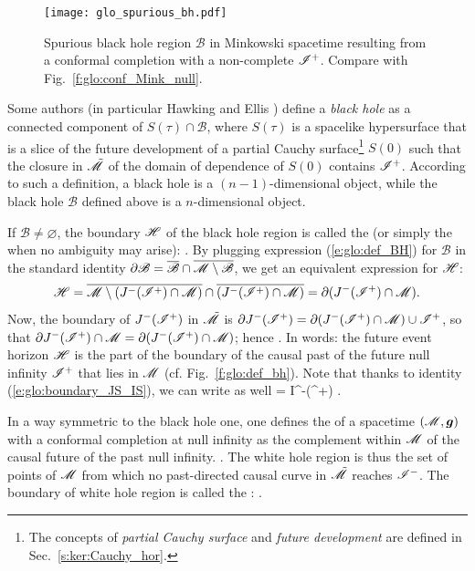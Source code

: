 \begin{figure}
\centerline{\texttt{[image: glo\_spurious\_bh.pdf]}}
\caption[]{\label{f:glo:spurious_bh} \footnotesize
Spurious black hole region $\mathscr{B}$ in Minkowski spacetime resulting
from a conformal completion with a non-complete $\mathscr{I}^+$.
Compare with Fig.~\ref{f:glo:conf_Mink_null}.}
\end{figure}



\begin{remark}
Some authors (in particular Hawking and Ellis \cite{HawkiE73}) define a
\emph{black hole} as a connected component of
$S(\tau) \cap \mathscr{B}$, where $S(\tau)$ is a spacelike
hypersurface that is a slice of the future development of a partial
Cauchy surface\footnote{The concepts of \emph{partial Cauchy surface}
and \emph{future development} are defined in Sec.~\ref{s:ker:Cauchy_hor}.} $S(0)$ such that the
closure in $\tilde{\mathscr{M}}$ of the domain of dependence of $S(0)$ contains $\mathscr{I}^+$.
According to such a definition, a black hole is a $(n-1)$-dimensional object,
while the black hole $\mathscr{B}$ defined above is a $n$-dimensional object.
\end{remark}

If $\mathscr{B}\not=\varnothing$, the boundary $\mathscr{H}$ of the black hole region
is called the 
(or simply the 
when no ambiguity may arise):
\be
    .
\ee
By plugging expression (\ref{e:glo:def_BH}) for $\mathscr{B}$ in the standard
identity $\partial \mathscr{B} =
\overline{\mathscr{B}} \cap \overline{\mathscr{M}\setminus \mathscr{B}}$, we get
an equivalent expression for $\mathscr{H}$:
\[
    \mathscr{H} = \overline{\mathscr{M} \setminus (J^-(\mathscr{I}^+)\cap\mathscr{M})} \cap
        \overline{(J^-(\mathscr{I}^+)\cap\mathscr{M})}
        = \partial(J^-(\mathscr{I}^+)\cap\mathscr{M}) .
\]
Now, the boundary of $J^-(\mathscr{I}^+)$ in $\tilde{\mathscr{M}}$ is
$\partial J^-(\mathscr{I}^+) = \partial (J^-(\mathscr{I}^+)\cap\mathscr{M}) \cup \mathscr{I}^+$, so that
$\partial J^-(\mathscr{I}^+) \cap \mathscr{M} =  \partial(J^-(\mathscr{I}^+)\cap\mathscr{M})$; hence
\be
    .
\ee
In words: the future event horizon $\mathscr{H}$ is the part of the boundary of the causal past
of the future null infinity $\mathscr{I}^+$ that lies in $\mathscr{M}$ (cf. Fig.~\ref{f:glo:def_bh}).
Note that thanks to identity (\ref{e:glo:boundary_JS_IS}), we can write as
well
\be
    \Hor = \partial I^-(\scri^+) \cap \M .
\ee

In a way symmetric to the black hole one, one defines
the  of a
spacetime $(\mathscr{M},\bm{g})$ with a conformal completion at null infinity as the
complement within $\mathscr{M}$ of the causal future of the past null infinity.
\be \label{e:glo:def_white_hole}
     .
\ee
The white hole region is thus the set of points of $\mathscr{M}$
from which no past-directed causal curve in $\tilde{\mathscr{M}}$ reaches $\mathscr{I}^-$.
The boundary of white hole region is called the
:
\be
     .
\ee

